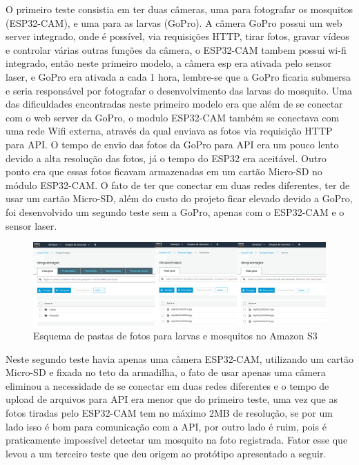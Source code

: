 \documentclass[
	12pt,				%
	openright,			%
	oneside,			%
	a4paper,			%
	chapter=TITLE,		%
	english,			%
	brazil				%
	]{abntex2}
\begin{document}
O primeiro teste consistia em ter duas câmeras, uma para fotografar 
os mosquitos (ESP32-CAM), e uma para as larvas (GoPro). A câmera GoPro possui um web server integrado, onde é possível, via requisições HTTP, tirar fotos, gravar vídeos e controlar 
várias outras funções da câmera, o ESP32-CAM tambem possui wi-fi integrado, então neste primeiro modelo, a câmera esp era ativada pelo sensor laser, e GoPro era ativada a cada 1 hora, 
lembre-se que a GoPro ficaria submersa e seria responsável por fotografar o desenvolvimento das larvas do mosquito. 
Uma das dificuldades encontradas neste primeiro modelo era que além de se conectar com o web server da GoPro, 
o modulo ESP32-CAM também se conectava com uma rede Wifi externa, através da qual enviava as fotos via requisição HTTP para API. 
O tempo de envio das fotos da GoPro para API era um pouco lento devido a alta resolução das fotos, já o tempo do ESP32 era aceitável. 
Outro ponto era que essas fotos ficavam armazenadas em um cartão Micro-SD no módulo ESP32-CAM. O fato de ter que conectar em duas redes diferentes, 
ter de usar um cartão Micro-SD, além do custo do projeto ficar elevado devido a GoPro, foi desenvolvido um segundo teste sem a GoPro, apenas 
com o ESP32-CAM e o sensor laser.

\begin{figure}[H]
    \centering
    \includegraphics[scale=0.2]{imagens/larvasMosquitos.png}
    \caption{Esquema de pastas de fotos para larvas e mosquitos no Amazon S3}
        \label{fig:larvasMosquitos}
    \end{figure}

Neste segundo teste havia apenas uma câmera ESP32-CAM, utilizando um cartão Micro-SD e fixada no teto da armadilha, o fato de usar apenas uma câmera eliminou a necessidade 
de se conectar em duas redes diferentes e o tempo de upload de arquivos para API era menor que do primeiro teste, uma vez que as fotos tiradas pelo ESP32-CAM
tem no máximo 2MB de resolução, se por um lado isso é bom para comunicação com a API, por outro lado é ruim, pois é praticamente impossível detectar um mosquito na foto registrada. 
Fator esse que levou a um terceiro teste que deu origem ao protótipo apresentado a seguir. 
\end{document}
